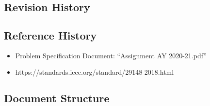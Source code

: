 \subsection{Revision History}
\subsection{Reference History}
\begin{itemize}
    \item Problem Specification Document: ``Assignment AY 2020-21.pdf''
    \item https://standards.ieee.org/standard/29148-2018.html
\end{itemize}
\subsection{Document Structure}
